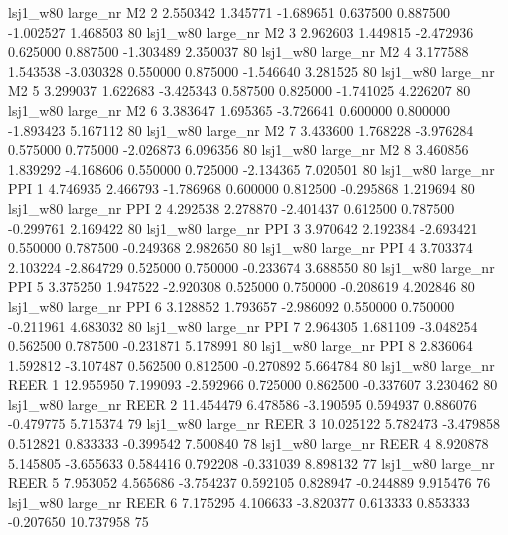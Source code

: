     lsj1_w80   large_nr       M2                 2  2.550342  1.345771  -1.689651 0.637500 0.887500 -1.002527    1.468503 80
    lsj1_w80   large_nr       M2                 3  2.962603  1.449815  -2.472936 0.625000 0.887500 -1.303489    2.350037 80
    lsj1_w80   large_nr       M2                 4  3.177588  1.543538  -3.030328 0.550000 0.875000 -1.546640    3.281525 80
    lsj1_w80   large_nr       M2                 5  3.299037  1.622683  -3.425343 0.587500 0.825000 -1.741025    4.226207 80
    lsj1_w80   large_nr       M2                 6  3.383647  1.695365  -3.726641 0.600000 0.800000 -1.893423    5.167112 80
    lsj1_w80   large_nr       M2                 7  3.433600  1.768228  -3.976284 0.575000 0.775000 -2.026873    6.096356 80
    lsj1_w80   large_nr       M2                 8  3.460856  1.839292  -4.168606 0.550000 0.725000 -2.134365    7.020501 80
    lsj1_w80   large_nr      PPI                 1  4.746935  2.466793  -1.786968 0.600000 0.812500 -0.295868    1.219694 80
    lsj1_w80   large_nr      PPI                 2  4.292538  2.278870  -2.401437 0.612500 0.787500 -0.299761    2.169422 80
    lsj1_w80   large_nr      PPI                 3  3.970642  2.192384  -2.693421 0.550000 0.787500 -0.249368    2.982650 80
    lsj1_w80   large_nr      PPI                 4  3.703374  2.103224  -2.864729 0.525000 0.750000 -0.233674    3.688550 80
    lsj1_w80   large_nr      PPI                 5  3.375250  1.947522  -2.920308 0.525000 0.750000 -0.208619    4.202846 80
    lsj1_w80   large_nr      PPI                 6  3.128852  1.793657  -2.986092 0.550000 0.750000 -0.211961    4.683032 80
    lsj1_w80   large_nr      PPI                 7  2.964305  1.681109  -3.048254 0.562500 0.787500 -0.231871    5.178991 80
    lsj1_w80   large_nr      PPI                 8  2.836064  1.592812  -3.107487 0.562500 0.812500 -0.270892    5.664784 80
    lsj1_w80   large_nr     REER                 1 12.955950  7.199093  -2.592966 0.725000 0.862500 -0.337607    3.230462 80
    lsj1_w80   large_nr     REER                 2 11.454479  6.478586  -3.190595 0.594937 0.886076 -0.479775    5.715374 79
    lsj1_w80   large_nr     REER                 3 10.025122  5.782473  -3.479858 0.512821 0.833333 -0.399542    7.500840 78
    lsj1_w80   large_nr     REER                 4  8.920878  5.145805  -3.655633 0.584416 0.792208 -0.331039    8.898132 77
    lsj1_w80   large_nr     REER                 5  7.953052  4.565686  -3.754237 0.592105 0.828947 -0.244889    9.915476 76
    lsj1_w80   large_nr     REER                 6  7.175295  4.106633  -3.820377 0.613333 0.853333 -0.207650   10.737958 75
